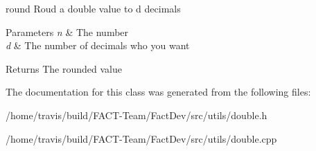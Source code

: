 round Roud a double value to d decimals 


\begin{DoxyParams}{Parameters}
{\em n} & The number \\
\hline
{\em d} & The number of decimals who you want \\
\hline
\end{DoxyParams}
\begin{DoxyReturn}{Returns}
The rounded value 
\end{DoxyReturn}


The documentation for this class was generated from the following files\-:\begin{DoxyCompactItemize}
\item 
/home/travis/build/\-F\-A\-C\-T-\/\-Team/\-Fact\-Dev/src/utils/double.\-h\item 
/home/travis/build/\-F\-A\-C\-T-\/\-Team/\-Fact\-Dev/src/utils/double.\-cpp\end{DoxyCompactItemize}
